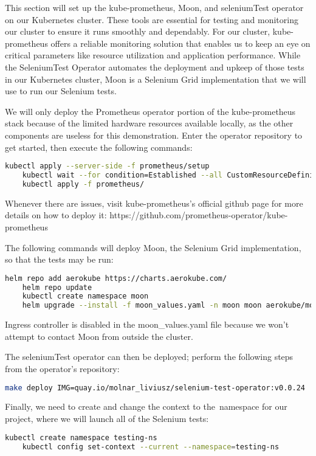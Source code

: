 This section will set up the kube-prometheus, Moon, and seleniumTest operator on our Kubernetes cluster. These tools are essential for testing and monitoring our cluster to ensure it runs smoothly and dependably. For our cluster, kube-prometheus offers a reliable monitoring solution that enables us to keep an eye on critical parameters like resource utilization and application performance. While the SeleniumTest Operator automates the deployment and upkeep of those tests in our Kubernetes cluster, Moon is a Selenium Grid implementation that we will use to run our Selenium tests. 

We will only deploy the Prometheus operator portion of the kube-prometheus stack because of the limited hardware resources available locally, as the other components are useless for this demonstration. Enter the operator repository to get started, then execute the following commands:
\begin{lstlisting}[language=bash]
	kubectl apply --server-side -f prometheus/setup
	kubectl wait --for condition=Established --all CustomResourceDefinition --namespace=monitoring
	kubectl apply -f prometheus/
\end{lstlisting}

Whenever there are issues, visit kube-prometheus's official github page for more details on how to deploy it: https://github.com/prometheus-operator/kube-prometheus

The following commands will deploy Moon, the Selenium Grid implementation, so that the tests may be run:
\begin{lstlisting}[language=bash]
	helm repo add aerokube https://charts.aerokube.com/
	helm repo update
	kubectl create namespace moon
	helm upgrade --install -f moon_values.yaml -n moon moon aerokube/moon2
\end{lstlisting}
Ingress controller is disabled in the moon_values.yaml file because we won't attempt to contact Moon from outside the cluster.

The seleniumTest operator can then be deployed; perform the following steps from the operator's repository:
\begin{lstlisting}[language=bash]
	make deploy IMG=quay.io/molnar_liviusz/selenium-test-operator:v0.0.24
\end{lstlisting}

Finally, we need to create and change the context to the namespace for our project, where we will launch all of the Selenium tests:
\begin{lstlisting}[language=bash]
	kubectl create namespace testing-ns
	kubectl config set-context --current --namespace=testing-ns
\end{lstlisting}


